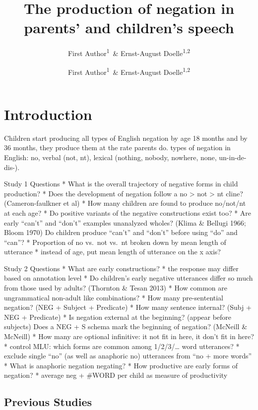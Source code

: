 \documentclass[man,floatsintext,draftall]{apa6}
\title{The production of negation in parents' and children's speech}
\author{First Author\textsuperscript{1}~\& Ernst-August
Doelle\textsuperscript{1,2}}
\author{First Author\textsuperscript{1}~\& Ernst-August Doelle\textsuperscript{1,2}}
\date{}
\affiliation{
\vspace{0.5cm}
\textsuperscript{1} Wilhelm-Wundt-University\\\textsuperscript{2} Konstanz Business School}
\begin{document}
\maketitle

\hypertarget{introduction}{%
\section{Introduction}\label{introduction}}

Children start producing all types of English negation by age 18 months and by 36 months, they produce them at the rate parents do.
types of negation in English: no, verbal (not, nt), lexical (nothing, nobody, nowhere, none, un-in-de-dis-).

Study 1 Questions
* What is the overall trajectory of negative forms in child production?
* Does the development of negation follow a no \textgreater{} not \textgreater{} nt cline? (Cameron-faulkner et al)
* How many children are found to produce no/not/nt at each age?
* Do positive variants of the negative constructions exist too?
* Are early \enquote{can't} and \enquote{don't} examples unanalyzed wholes? (Klima \& Bellugi 1966; Bloom 1970) Do children produce \enquote{can't} and \enquote{don't} before using \enquote{do} and \enquote{can}?
* Proportion of no vs.~not vs.~nt broken down by mean length of utterance
* instead of age, put mean length of utterance on the x axis?

Study 2 Questions
* What are early constructions?
* the response may differ based on annotation level
* Do children's early negative utterances differ so much from those used by adults? (Thornton \& Tesan 2013)
* How common are ungrammatical non-adult like combinations?
* How many pre-sentential negation? (NEG + Subject + Predicate)
* How many sentence internal? (Subj + NEG + Predicate)
* Is negation external at the beginning? (appear before subjects) Does a NEG + S schema mark the beginning of negation? (McNeill \& McNeill)
* How many are optional infinitive: it not fit in here, it don't fit in here?
* control MLU: which forms are common among 1/2/3/\ldots{} word utterances?
* exclude single \enquote{no} (as well as anaphoric no) utterances from \enquote{no + more words}
* What is anaphoric negation negating?
* How productive are early forms of negation?
* average neg + \#WORD per child as measure of productivity

\hypertarget{previous-studies}{%
\subsection{Previous Studies}\label{previous-studies}}
\end{document}
